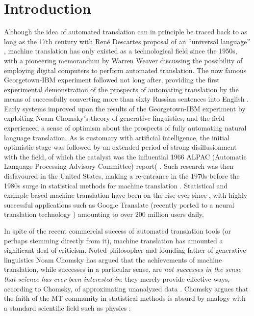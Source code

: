\documentclass[fleqn,10pt]{article}
\begin{document}
\section{Introduction}

Although the idea of automated translation can in principle be traced back to as long as the 17th century with Ren\'{e} Descartes proposal of an ``universal language'' \cite{dascal1982universal}, machine translation has only existed as a technological field since the 1950s, with a pioneering memorandum by  Warren Weaver \cite{locke1955machine,weaver1955translation} discussing the possibility of employing digital computers to perform automated translation. The now famous Georgetown-IBM experiment followed not long after, providing the first experimental demonstration of the prospects of automating translation by the means of successfully converting more than sixty Russian sentences into English \cite{gordin2015scientific}. Early systems improved upon the results of the Georgetown-IBM experiment by exploiting Noam Chomsky's theory of generative linguistics, and the field experienced a sense of optimism about the prospects of fully automating natural language translation. As is customary with artificial intelligence, the initial optimistic stage was followed by an extended period of strong disillusionment with the field, of which the catalyst was the influential 1966 ALPAC (Automatic Language Processing Advisory Committee) report( \cite{hutchins1986machine}. 
Such research was then disfavoured in the United States, making a re-entrance in the 1970s before the 1980s surge in statistical methods for machine translation \cite{koehn2009statistical,Moses2007}. Statistical and example-based machine translation have been on the rise ever since \cite{Bahdanau2014,carl2003recent,Firat2017}, with highly successful applications such as Google Translate (recently ported to a neural translation technology \cite{wu2016google}) amounting to over $200$ million users daily.

In spite of the recent commercial success of automated translation tools (or perhaps stemming directly from it), machine translation has amounted a significant deal of criticism. Noted philosopher and founding father of generative linguistics Noam Chomsky has argued that the achievements of machine translation, while successes in a particular sense, are \emph{not successes in the sense that science has ever been interested in}: they merely provide effective ways, according to Chomsky, of approximating unanalyzed data \cite{Chomsky2011,norvig2017chomsky}. Chomsky argues that the faith of the MT community in statistical methods is absurd by analogy with a standard scientific field such as physics \cite{Chomsky2011}:
\end{document}

